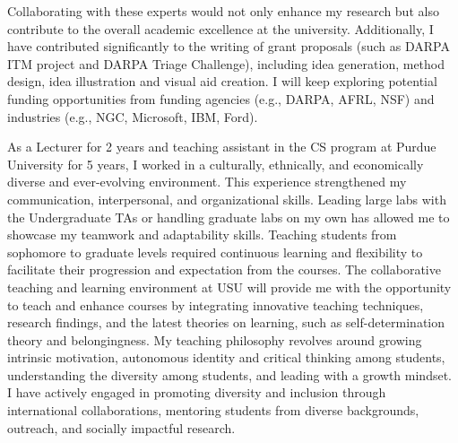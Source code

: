 \documentclass[9pt]{article}
\renewcommand*\paragraph[1]{}
\begin{document}
Collaborating with these experts would not only enhance my research but also contribute to the overall academic excellence at the university.
%
Additionally, I have contributed significantly to the writing of grant proposals (such as DARPA ITM project and DARPA Triage Challenge), including idea generation, method design, idea illustration and visual aid creation. I will keep exploring potential funding opportunities from funding agencies (e.g., DARPA, AFRL, NSF)
and industries (e.g., NGC, Microsoft, IBM, Ford).

As a Lecturer for 2 years and teaching assistant in the CS program at Purdue University for 5 years, I worked in a culturally, ethnically, and economically diverse and ever-evolving environment. This experience strengthened my communication, interpersonal, and organizational skills. 
Leading large labs with the Undergraduate TAs or handling graduate labs on my own has allowed me to showcase my teamwork and adaptability skills. Teaching students from sophomore to graduate levels required continuous learning and flexibility to facilitate their progression and expectation from the courses.
%
The collaborative teaching and learning environment at USU will provide me with the opportunity to teach and enhance courses by integrating innovative teaching techniques, research findings, and the latest theories on learning, such as self-determination theory and belongingness.
My teaching philosophy revolves around growing intrinsic motivation, autonomous identity and critical thinking among students, understanding the diversity among students, and leading with a growth mindset. I have actively engaged in promoting diversity and inclusion through international collaborations, mentoring students from diverse backgrounds, outreach, and socially impactful research.
%

\end{document}

